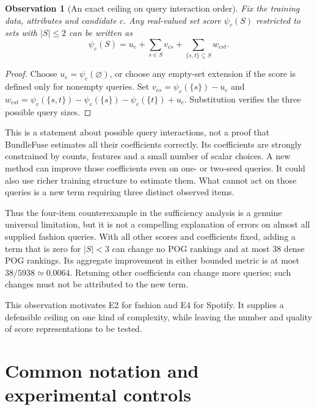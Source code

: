 \documentclass[11pt,a4paper]{article}
\newtheorem{observation}{Observation}
\begin{document}
\begin{observation}[An exact ceiling on query interaction order]
Fix the training data, attributes and candidate $c$. Any real-valued set
score $\psi_c(S)$ restricted to sets with $|S|\leq2$ can be written as
\begin{equation}
 \psi_c(S)=u_c+\sum_{s\in S}v_{cs}
                 +\sum_{\{s,t\}\subseteq S}w_{cst}.
 \label{eq:orderceiling}
\end{equation}
\end{observation}
\begin{proof}
Choose $u_c=\psi_c(\varnothing)$, or choose any empty-set extension if the
score is defined only for nonempty queries. Set
$v_{cs}=\psi_c(\{s\})-u_c$ and
$w_{cst}=\psi_c(\{s,t\})-\psi_c(\{s\})-\psi_c(\{t\})+u_c$.
Substitution verifies the three possible query sizes.
\end{proof}

This is a statement about possible query interactions, not a proof that
BundleFuse estimates all their coefficients correctly. Its coefficients are
strongly constrained by counts, features and a small number of scalar choices.
A new method can improve those coefficients even on one- or two-seed queries.
It could also use richer training structure to estimate them. What cannot act
on those queries is a new term requiring three distinct observed items.

Thus the four-item counterexample in the sufficiency analysis is a genuine
universal limitation, but it is not a compelling explanation of errors on
almost all supplied fashion queries. With all other scores and coefficients
fixed, adding a term that is zero for $|S|<3$ can change no POG rankings and
at most 38 dense POG rankings. Its aggregate improvement in either bounded
metric is at most $38/5938\simeq0.0064$. Retuning other coefficients can
change more queries; such changes must not be attributed to the new term.

This observation motivates E2 for fashion and E4 for Spotify. It supplies
a defensible ceiling on one kind of complexity, while leaving the number
and quality of score representations to be tested.

\section{Common notation and experimental controls}
\label{sec:protocol}
\end{document}

